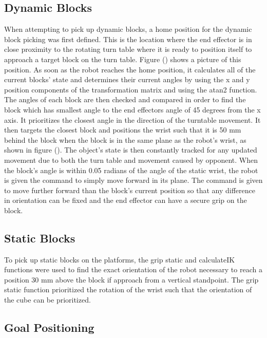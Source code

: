 \documentclass{article}
\begin{document}
    \subsection{Dynamic Blocks}
    When attempting to pick up dynamic blocks, a home position for the dynamic block picking was first defined. This is the location where the end effector is in close proximity to the rotating turn table where it is ready to position itself to approach a target block on the turn table. Figure () shows a picture of this position. As soon as the robot reaches the home position, it calculates all of the current blocks' state and determines their current angles by using the x and y position components of the transformation matrix and using the atan2 function. The angles of each block are then checked and compared in order to find the block which has smallest angle to the end effectors angle of 45 degrees from the x axis. It prioritizes the closest angle in the direction of the turntable movement. It then targets the closest block and positions the wrist such that it is 50 mm behind the block when the block is in the same plane as the robot’s wrist, as shown in figure (). The object’s state is then constantly tracked for any updated movement due to both the turn table and movement caused by opponent. When the block’s angle is within 0.05 radians of the angle of the static wrist, the robot is given the command to simply move forward in its plane. The command is given to move further forward than the block’s current position so that any difference in orientation can be fixed and the end effector can have a secure grip on the block. 
    
    \subsection{Static Blocks}
    To pick up static blocks on the platforms, the grip static and calculateIK functions were used to find the exact orientation of the robot necessary to reach a position 30 mm above the block if approach from a vertical standpoint. The grip static function prioritized the rotation of the wrist such that the orientation of the cube can be prioritized. 
    
    \subsection{Goal Positioning}
    
\end{document}

